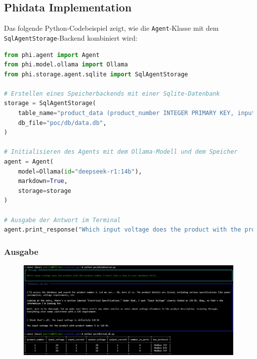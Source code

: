 \subsection{Phidata Implementation}
\label{sec:phidata-implementation}



Das folgende Python-Codebeispiel zeigt, wie die \texttt{Agent}-Klasse mit dem \texttt{SqlAgentStorage}-Backend kombiniert wird:

\begin{lstlisting}[language=Python, style=pythonstyle, caption={Phidata Implementation des KI-Agenten}]
from phi.agent import Agent
from phi.model.ollama import Ollama
from phi.storage.agent.sqlite import SqlAgentStorage

# Erstellen eines Speicherbackends mit einer Sqlite-Datenbank
storage = SqlAgentStorage(
    table_name="product_data (product_number INTEGER PRIMARY KEY, input_voltage INTEGER, input_current INTEGER, output_voltage INTEGER, output_current INTEGER, number_io_ports INTEGER, bus_protocol TEXT)",
    db_file="poc/db/data.db",
)

# Initialisieren des Agents mit dem Ollama-Modell und dem Speicher
agent = Agent(
    model=Ollama(id="deepseek-r1:14b"),
    markdown=True,
    storage=storage
)

# Ausgabe der Antwort im Terminal
agent.print_response("Which input voltage does the product with the product number 2 have? Take a look in your database first.")
\end{lstlisting}

\subsubsection{Ausgabe}

\begin{figure}[H]
    \begin{center}
        \includegraphics[width=1\linewidth]{Figures/results/phidata_01.png} 
        \label{fig:phidata-bsp01}
    \end {center}
\end{figure}


